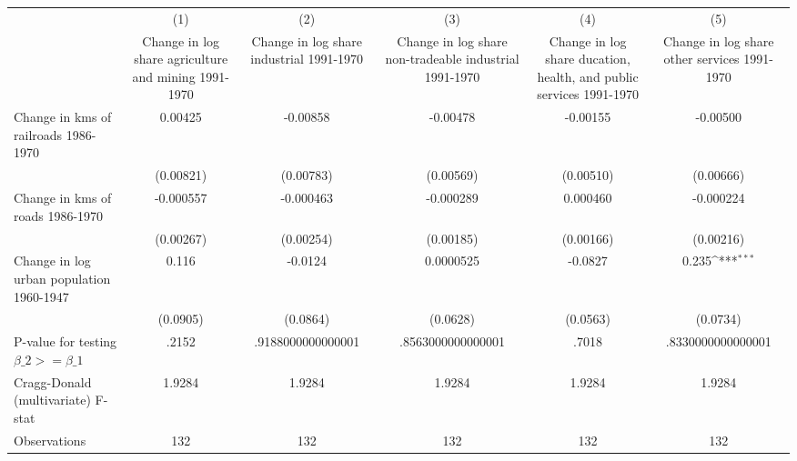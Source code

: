 {
\def\sym#1{\ifmmode^{#1}\else\(^{#1}\)\fi}
\begin{tabular}{l*{5}{c}}
\hline\hline
                &\multicolumn{1}{c}{(1)}&\multicolumn{1}{c}{(2)}&\multicolumn{1}{c}{(3)}&\multicolumn{1}{c}{(4)}&\multicolumn{1}{c}{(5)}\\
                &\multicolumn{1}{c}{Change in log share agriculture and mining 1991-1970}&\multicolumn{1}{c}{Change in log share industrial 1991-1970}&\multicolumn{1}{c}{Change in log share non-tradeable industrial 1991-1970}&\multicolumn{1}{c}{Change in log share ducation, health, and public services 1991-1970}&\multicolumn{1}{c}{Change in log share other services 1991-1970}\\
\hline
Change in kms of railroads 1986-1970&  0.00425         & -0.00858         & -0.00478         & -0.00155         & -0.00500         \\
                &(0.00821)         &(0.00783)         &(0.00569)         &(0.00510)         &(0.00666)         \\
[1em]
Change in kms of roads 1986-1970&-0.000557         &-0.000463         &-0.000289         & 0.000460         &-0.000224         \\
                &(0.00267)         &(0.00254)         &(0.00185)         &(0.00166)         &(0.00216)         \\
[1em]
Change in log urban population 1960-1947&    0.116         &  -0.0124         &0.0000525         &  -0.0827         &    0.235\sym{***}\\
                & (0.0905)         & (0.0864)         & (0.0628)         & (0.0563)         & (0.0734)         \\
\hline
P-value for testing $\beta\_{2} >= \beta\_{1}$&    .2152         &.9188000000000001         &.8563000000000001         &    .7018         &.8330000000000001         \\
Cragg-Donald (multivariate) F-stat&   1.9284         &   1.9284         &   1.9284         &   1.9284         &   1.9284         \\
Observations    &      132         &      132         &      132         &      132         &      132         \\
\hline\hline
\end{tabular}
}
